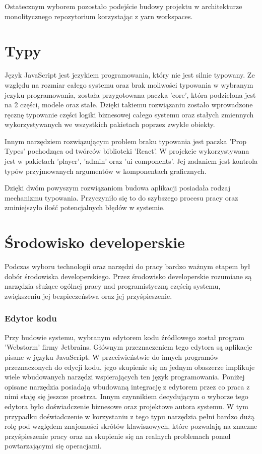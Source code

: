 Ostatecznym wyborem pozostało podejście budowy projektu w architekturze monolitycznego repozytorium korzystając z yarn workspaces.

\section{Typy}
Język JavaScript jest jezykiem programowania, który nie jest silnie typowany. Ze względu na rozmiar całego systemu oraz brak moliwości typowania w wybranym jezyku programowania, została przygotowana paczka 'core', która podzielona jest na 2 części, modele oraz stałe.
Dzięki takiemu rozwiązaniu zostało wprowadzone ręcznę typowanie części logiki biznesowej całego systemu oraz stałych zmiennych wykorzystywanych we wszystkich pakietach poprzez zwykłe obiekty. 

Innym narzędziem rozwiązującym problem braku typowania jest paczka 'Prop Types' pochodząca od twórców biblioteki 'React'. W projekcie wykorzystywana jest w pakietach 'player', 'admin' oraz 'ui-components'. Jej zadaniem jest kontrola typów przyjmowanych argumentów w komponentach graficznych.

Dzięki dwóm powyszym rozwiązaniom budowa aplikacji posiadała rodzaj mechanizmu typowania. Przyczyniło się to do szybszego procesu pracy oraz zminiejszyło ilość potencjalnych błędów w systemie.

\section{Środowisko developerskie}
Podczas wyboru technologii oraz narzędzi do pracy bardzo ważnym etapem był dobór środowiska developerskiego. Przez środowisko developerskie rozumiane są narzędzia służące ogólnej pracy nad programistyczną częścią systemu, zwiększeniu jej bezpieczeństwa oraz jej przyśpieszenie.

\subsubsection{Edytor kodu}
Przy budowie systemu, wybranym edytorem kodu źródłowego został program 'Webstorm' firmy Jetbrains. Głównym przeznaczeniem tego edytora są aplikacje pisane w języku JavaScript. W przeciwieństwie do innych programów przeznaczonych do edycji kodu, jego skupienie się na jednym obaszerze implikuje wiele wbudowanych narzędzi wspierających ten język programowania. Poniżej opisane narzędzia posiadają wbudowaną integrację z edytorem przez co praca z nimi staję się jeszcze prostrza. Innym czynnikiem decydującym o wyborze tego edytora było doświadczenie biznesowe oraz projektowe autora systemu. W tym przypadku doświadczenie w korzystaniu z tego typu narzędzia pełni bardzo dużą rolę pod względem znajomości skrótów klawiszowych, które pozwalają na znaczne przyśpieszenie pracy oraz na skupienie się na realnych problemach ponad powtarzającymi się operacjami.


